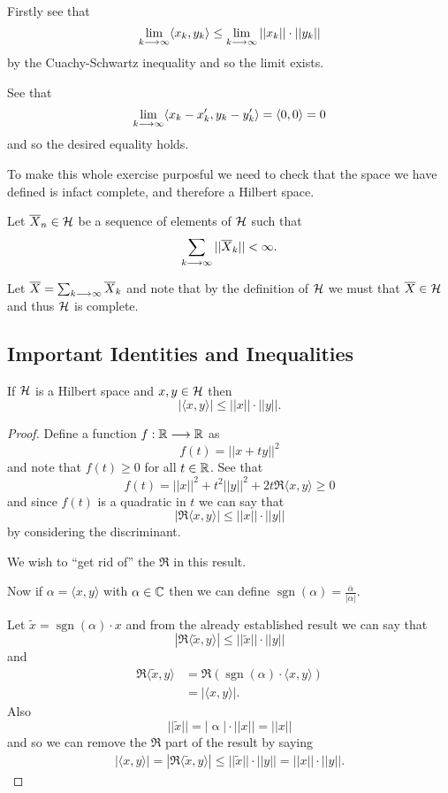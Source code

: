 \documentclass{unswmaths}
\begin{document}
Firstly see that 
$$
	\lim_{k \longrightarrow \infty} \langle x_k, y_k \rangle \leq \lim_{k \longrightarrow \infty} ||x_k||\cdot||y_k||
$$
by the Cuachy-Schwartz inequality and so the limit exists.

See that
$$
	\lim_{k \longrightarrow \infty} \langle x_k - x'_k, y_k - y'_k \rangle = \langle 0, 0 \rangle = 0 
$$
and so the desired equality holds.

To make this whole exercise purposful we need to check that the space we have defined is infact complete, and
therefore a Hilbert space.

Let $ \overline{X}_n \in \mathcal{H} $ be a sequence of elements of $ \mathcal{H} $ such that
$$
	\sum_{k \longrightarrow \infty} ||\overline{X}_k|| < \infty.
$$

Let $ \overline{X} = \sum_{k \longrightarrow \infty} \overline{X}_k $ and note that
by the definition of $ \mathcal{H} $ we must that $ \overline{X} \in \mathcal{H} $ and thus $\mathcal{H} $ is complete.

\subsection*{Important Identities and Inequalities}

\begin{theorem}
	If $ \mathcal{H} $ is a Hilbert space and $ x, y \in \mathcal{H} $ then 
	$$
		| \langle x, y \rangle | \leq ||x||\cdot||y||.
	$$
\end{theorem}
\begin{proof}
	Define a function $ f : \mathbb{R} \longrightarrow \mathbb{R} $ as
	$$
		f(t) = ||x+ty||^2
	$$
	and note that $ f(t) \geq 0 $ for all $ t \in \mathbb{R} $.
	See that
	$$
		f(t) = ||x||^2 + t^2||y||^2 + 2t \Re{ \langle x,y \rangle } \geq 0 
	$$
	and since $ f(t) $ is a quadratic in $ t $ we can say that
	$$
		|\Re\langle x,y\rangle| \leq ||x|| \cdot ||y||
	$$
	by considering the discriminant.
	
	We wish to ``get rid of'' the $ \Re $ in this result.
	
	Now if $ \alpha = \langle x, y \rangle $ with $ \alpha \in \mathbb{C} $ then we can define
	$ \operatorname{sgn}(\alpha) = \frac{\overline{\alpha}}{|\alpha|} $.
	
	Let $ \tilde{x} = \operatorname{sgn}(\alpha) \cdot x $ and from the already established result we can say that
	$$
		| \Re \langle \tilde{x}, y \rangle | \leq ||\tilde{x}||\cdot ||y||
	$$
	and
	\begin{align*}
		\Re \langle \tilde{x}, y \rangle &= \Re(\operatorname{sgn}(\alpha)\cdot \langle x, y \rangle ) \\
		&= |\langle x, y \rangle |.
	\end{align*}
	Also $$ ||\tilde{x}|| = | \operatorname{\alpha}| \cdot ||x|| = ||x|| $$
	and so we can remove the $ \Re $ part of the result by saying 
	\begin{align*}
		|\langle x, y \rangle | = | \Re \langle \tilde{x}, y \rangle | \leq ||\tilde{x}|| \cdot ||y|| = ||x||\cdot ||y||.
	\end{align*}
\end{proof}
\end{document}
